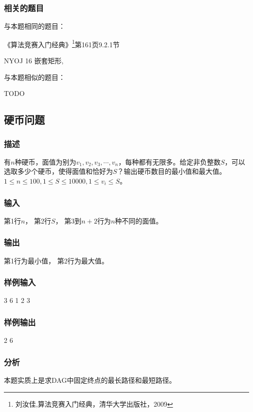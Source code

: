 \subsubsection{相关的题目}
与本题相同的题目：
\begindot
\item 《算法竞赛入门经典》\footnote{刘汝佳,算法竞赛入门经典，清华大学出版社，2009}第161页9.2.1节
\item  NYOJ 16 嵌套矩形, 
\myenddot

与本题相似的题目：
\begindot
\item  TODO
\myenddot

\subsection{硬币问题}

\subsubsection{描述}
有$n$种硬币，面值为别为$v_1,v_2,v_3,\cdots, v_n$，每种都有无限多。给定非负整数$S$，可以
选取多少个硬币，使得面值和恰好为$S$？输出硬币数目的最小值和最大值。
$1 \leq n \leq 100, 1 \leq S \leq 10000, 1 \leq v_i \leq S$。

\subsubsection{输入}
第1行$n$，
第2行$S$，
第3到$n+2$行为$n$种不同的面值。

\subsubsection{输出}
第1行为最小值，
第2行为最大值。

\subsubsection{样例输入}
\begin{Code}
3
6
1
2
3
\end{Code}

\subsubsection{样例输出}
\begin{Code}
2
6
\end{Code}

\subsubsection{分析}
本题实质上是求DAG中固定终点的最长路径和最短路径。

